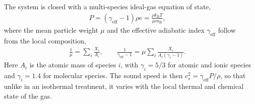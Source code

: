 \documentclass[twocolumn,linenumbers]{aastex631}
\begin{document}
The system is closed with a multi-species ideal-gas equation of state,
\begin{align}
P = (\gamma_\mathrm{eff} - 1)\rho e = \frac{\rho k_\mathrm{B} T}{\mu m_\mathrm{H}},
\end{align}
where the mean particle weight $\mu$ and the effective adiabatic index $\gamma_\mathrm{eff}$ follow from the local composition,
\begin{align}
\frac{1}{\mu} = \sum_i \frac{X_i}{A_i}, \qquad \frac{1}{\gamma_\mathrm{eff} - 1} = \mu \sum_i \frac{X_i}{A_i (\gamma_i - 1)}.
\end{align}
Here $A_i$ is the atomic mass of species $i$, with $\gamma_i = 5/3$ for atomic and ionic species and $\gamma_i = 1.4$ for molecular species. The sound speed is then $c_s^2 = \gamma_\mathrm{eff} P / \rho$, so that unlike in an isothermal treatment, it varies with the local thermal and chemical state of the gas.
\end{document}
